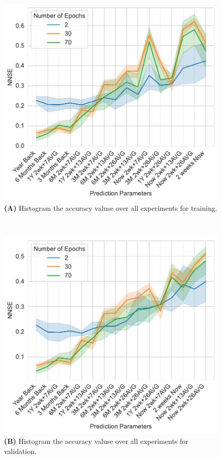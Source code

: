 \documentclass[utf8]{FrontiersinVancouver} %
\begin{document}
\begin{figure}[p]

  \begin{center}
     \begin{minipage}[t]{0.65\textwidth}
        \includegraphics[width=1.0\linewidth]{images/A100-NNSE-all-epochs-training.pdf}
        {\bf (A)} Histogram the accuracy valuse over all experiments for training.
     \end{minipage}
  \end{center}
  \ \
  \begin{center}
     \begin{minipage}[t]{0.65\textwidth}
        \includegraphics[width=1.0\linewidth]{images/A100-NNSE-all-epochs-validation.pdf}
        {\bf (B)} Histogram the accuracy valuse over all experiments for validation.
     \end{minipage}
  \end{center}


\end{figure}
\end{document}
